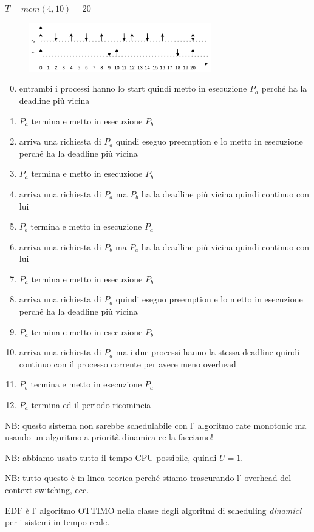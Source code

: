 $ T=mcm(4,10) = 20 $

\begin{figure}[H]
    \centering
    \includegraphics[width=300px]{images/4_Scheduling/edf.png}
\end{figure}
\begin{enumerate}
    \setcounter{enumi}{-1}
    \item entrambi i processi hanno lo start quindi metto in esecuzione $P_a$ perché ha la deadline più vicina

    \setcounter{enumi}{1}
    \item $P_a$ termina e metto in esecuzione $P_b$

    \setcounter{enumi}{3}
    \item arriva una richiesta di $P_a$ quindi eseguo preemption e lo metto in esecuzione perché ha la deadline più vicina

    \setcounter{enumi}{5}
    \item $P_a$ termina e metto in esecuzione $P_b$

    \setcounter{enumi}{7}
    \item arriva una richiesta di $P_a$ ma $P_b$ ha la deadline più vicina quindi continuo con lui
    \item $P_b$ termina e metto in esecuzione $P_a$
    \item arriva una richiesta di $P_b$ ma $P_a$ ha la deadline più vicina quindi continuo con lui
    \item $P_a$ termina e metto in esecuzione $P_b$
    \item arriva una richiesta di $P_a$ quindi eseguo preemption e lo metto in esecuzione perché ha la deadline più vicina

    \setcounter{enumi}{13}
    \item $P_a$ termina e metto in esecuzione $P_b$

    \setcounter{enumi}{15}
    \item arriva una richiesta di $P_a$ ma i due processi hanno la stessa deadline quindi continuo con il processo corrente per avere meno overhead

    \setcounter{enumi}{17}
    \item $P_b$ termina e metto in esecuzione $P_a$

    \setcounter{enumi}{19}
    \item $P_a$ termina ed il periodo ricomincia
\end{enumerate}

NB: questo sistema non sarebbe schedulabile con l' algoritmo rate monotonic ma usando un algoritmo a priorità dinamica ce la facciamo!

NB: abbiamo usato tutto il tempo CPU possibile, quindi $U=1$.

NB: tutto questo è in linea teorica perché stiamo trascurando l' overhead del context switching, ecc.

EDF è l' algoritmo OTTIMO nella classe degli algoritmi di scheduling \emph{dinamici} per i sistemi in tempo reale.


